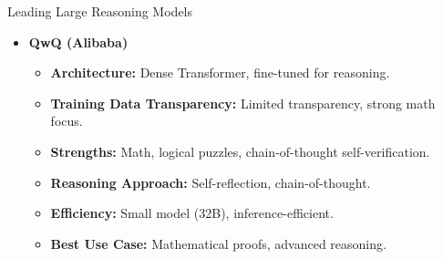 \begin{frame}[allowframebreaks]{Leading Large Reasoning Models}
\begin{itemize}
\begin{itemize}
            \item \textbf{Best Use Case:} Cost-effective coding LLM.
        \end{itemize}
    \framebreak
        \item \textbf{QwQ (Alibaba)}
        \begin{itemize}
            \item \textbf{Architecture:} Dense Transformer, fine-tuned for reasoning.
            \item \textbf{Training Data Transparency:} Limited transparency, strong math focus.
            \item \textbf{Strengths:} Math, logical puzzles, chain-of-thought self-verification.
            \item \textbf{Reasoning Approach:} Self-reflection, chain-of-thought.
            \item \textbf{Efficiency:} Small model (32B), inference-efficient.
            \item \textbf{Best Use Case:} Mathematical proofs, advanced reasoning.
        \end{itemize}
    \end{itemize}
\end{frame}



